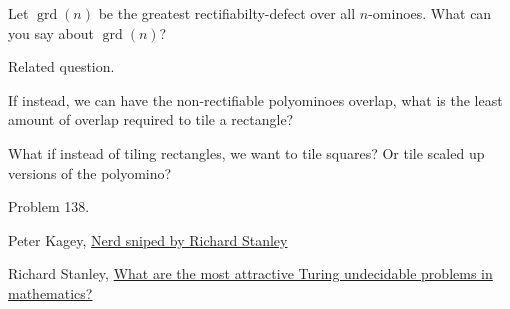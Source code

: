 \documentclass{article}
\begin{document}
\begin{question}
  Let $\operatorname{grd}(n)$ be the greatest rectifiabilty-defect over all $n$-ominoes. What can you say about $\operatorname{grd}(n)$?
\end{question}

\begin{related}
  \item Related question.
  \item If instead, we can have the non-rectifiable polyominoes overlap, what is the least amount of overlap required to tile a rectangle?
  \item What if instead of tiling rectangles, we want to tile squares? Or tile scaled up versions of the polyomino?
\end{related}

\begin{references}
  \item Problem 138.
  \item Peter Kagey, \href{https://peterkagey.com/blog/2025/06/nerd-sniped-by-richard-stanley/}{Nerd sniped by Richard Stanley}
  \item Richard Stanley, \href{https://mathoverflow.net/a/15306/104733}{What are the most attractive Turing undecidable problems in mathematics?}
\end{references}
\end{document}
